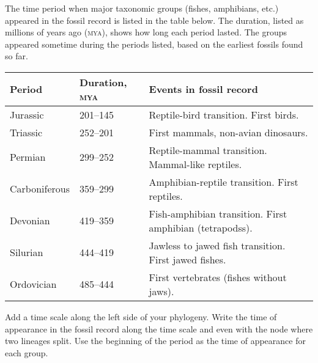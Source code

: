 \documentclass[12pt, hidelinks]{exam}
\begin{document}
\begin{questions}
The time period when major taxonomic groups (fishes, amphibians, etc.) appeared in the fossil record is listed in the table below. The duration, listed as millions of years ago (\textsc{mya}), shows how long each period lasted. The groups appeared sometime during the periods listed, based on the earliest fossils found so far.

\begin{longtable}[c]{@{}L{1in}L{1.35in}L{2.65in}@{}}
\toprule
Period			& Duration, \textsc{mya} 	& Events in fossil record \tabularnewline
\midrule
Jurassic		& 201–145					& Reptile-bird transition. First birds.  \tabularnewline
Triassic		& 252–201					& First mammals, non-avian dinosaurs. \tabularnewline
Permian			& 299–252					& Reptile-mammal transition. Mammal-like reptiles. \tabularnewline
Carboniferous	& 359–299					& Amphibian-reptile transition. First reptiles. \tabularnewline
Devonian		& 419–359					& Fish-amphibian transition. First amphibian (tetrapodss). \tabularnewline
Silurian		& 444–419					& Jawless to jawed fish transition. First jawed fishes. \tabularnewline
Ordovician		& 485–444					& First vertebrates (fishes without jaws). \tabularnewline
\bottomrule
\end{longtable}\label{transition_table}


\question[Checkout]
Add a time scale along the left side of your phylogeny. Write the time of appearance in the fossil record along the time scale and even with the node where two lineages split. Use the beginning of the period as the time of appearance for each group.

\ifprintanswers
\medskip

\scalebox{0.93}{%
\begin{forest}
timelinetree,
timeline
[, age=485
[, age=444
  [jawless fishes]
  [, age=419
   [jawed fishes]
    [, age=359
     [,
	  [amphibians]
     ]
      [,age=299
       [
	    [mammals]
	   ]
	    [,age=201
	     [birds]
	     [reptiles]
	    ]
      ]
    ]
 ]
]]
\end{forest}
}%
\fi
\end{questions}
\end{document}
